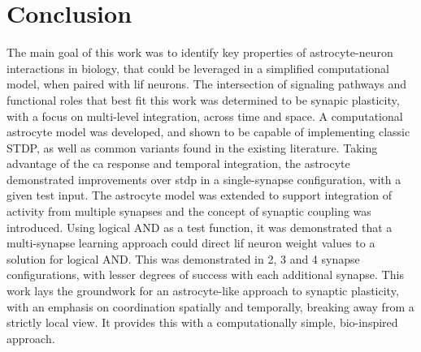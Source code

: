 \documentclass[conference]{IEEEtran}
\newcommand{\ca}{\gls{ca}\textrm{ }}
\begin{document}
\section{Conclusion} \label{section:conclusion}
The main goal of this work was to identify key properties of astrocyte-neuron
interactions in biology, that could be leveraged in a simplified computational
model, when paired with \gls{lif} neurons. The intersection of signaling
pathways and functional roles that best fit this work was determined to be
synapic plasticity, with a focus on multi-level integration, across time and
space. A computational astrocyte model was developed, and shown to be capable of
implementing classic STDP, as well as common variants found in the existing
literature. Taking advantage of the \ca response and temporal integration, the
astrocyte demonstrated improvements over \gls{stdp} in a single-synapse
configuration, with a given test input. The astrocyte model was extended to
support integration of activity from multiple synapses and the concept of
synaptic coupling was introduced. Using logical AND as a test function, it was
demonstrated that a multi-synapse learning approach could direct \gls{lif}
neuron weight values to a solution for logical AND. This was demonstrated in 2,
3 and 4 synapse configurations, with lesser degrees of success with each
additional synapse. This work lays the groundwork for an astrocyte-like approach
to synaptic plasticity, with an emphasis on coordination spatially and
temporally, breaking away from a strictly local view. It provides this with a
computationally simple, bio-inspired approach.



\renewcommand*{\bibfont}{\small}

\printbibliography[heading=bibintoc]
\end{document}

